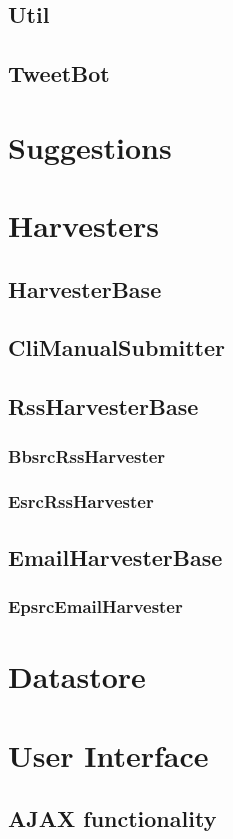 \subsection{Util}
\subsection{TweetBot}
\section{Suggestions}
\section{Harvesters}
\subsection{HarvesterBase}
\subsection{CliManualSubmitter}
\subsection{RssHarvesterBase}
\subsubsection{BbsrcRssHarvester}
\subsubsection{EsrcRssHarvester}
\subsection{EmailHarvesterBase}
\subsubsection{EpsrcEmailHarvester}
\section{Datastore}
\section{User Interface}
\subsection{AJAX functionality}
